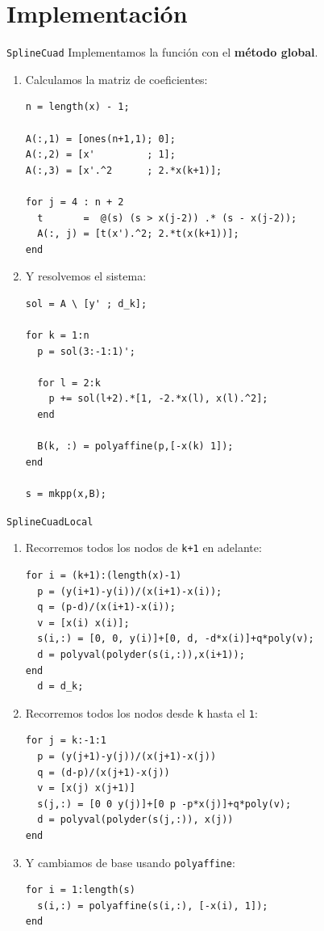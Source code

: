\documentclass[compress]{beamer}
\theoremstyle{definition}
\theoremstyle{remark}
\begin{document}
\section{Implementación}

\begin{frame}[fragile]{\texttt{SplineCuad}}
Implementamos la función con el \textbf{método global}.
\begin{enumerate}[<only@+>]
\item Calculamos la matriz de coeficientes:
\begin{lstlisting}
n = length(x) - 1;

A(:,1) = [ones(n+1,1); 0];
A(:,2) = [x'         ; 1];
A(:,3) = [x'.^2      ; 2.*x(k+1)];

for j = 4 : n + 2
  t       =  @(s) (s > x(j-2)) .* (s - x(j-2));
  A(:, j) = [t(x').^2; 2.*t(x(k+1))];
end
\end{lstlisting}

\item Y resolvemos el sistema:
\begin{lstlisting}
sol = A \ [y' ; d_k];

for k = 1:n
  p = sol(3:-1:1)';

  for l = 2:k
    p += sol(l+2).*[1, -2.*x(l), x(l).^2];
  end

  B(k, :) = polyaffine(p,[-x(k) 1]);
end

s = mkpp(x,B);
\end{lstlisting}
\end{enumerate}
\end{frame}

\begin{frame}[fragile]{\texttt{SplineCuadLocal}}
\begin{enumerate}[<only@+>]

\item Recorremos todos los nodos de \texttt{k+1} en adelante:
\begin{lstlisting}
for i = (k+1):(length(x)-1)
  p = (y(i+1)-y(i))/(x(i+1)-x(i));
  q = (p-d)/(x(i+1)-x(i));
  v = [x(i) x(i)];
  s(i,:) = [0, 0, y(i)]+[0, d, -d*x(i)]+q*poly(v);
  d = polyval(polyder(s(i,:)),x(i+1));
end
  d = d_k;
\end{lstlisting}

\item Recorremos todos los nodos desde \texttt{k} hasta el \texttt{1}:
\begin{lstlisting}
for j = k:-1:1
  p = (y(j+1)-y(j))/(x(j+1)-x(j))
  q = (d-p)/(x(j+1)-x(j))
  v = [x(j) x(j+1)]
  s(j,:) = [0 0 y(j)]+[0 p -p*x(j)]+q*poly(v);
  d = polyval(polyder(s(j,:)), x(j))
end
\end{lstlisting}

\item Y cambiamos de base usando \texttt{polyaffine}:
\begin{lstlisting}
for i = 1:length(s)
  s(i,:) = polyaffine(s(i,:), [-x(i), 1]);
end
\end{lstlisting}
\end{enumerate}
\end{frame}
\end{document}
